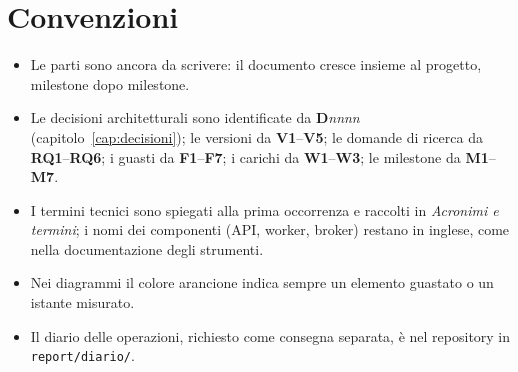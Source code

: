 \section*{Convenzioni}

\begin{itemize}
  \item Le parti  sono ancora da scrivere: il documento cresce insieme al progetto, milestone dopo milestone.
  \item Le decisioni architetturali sono identificate da \textbf{D}\textit{nnnn} (capitolo~\ref{cap:decisioni}); le versioni da \textbf{V1}--\textbf{V5}; le domande di ricerca da \textbf{RQ1}--\textbf{RQ6}; i guasti da \textbf{F1}--\textbf{F7}; i carichi da \textbf{W1}--\textbf{W3}; le milestone da \textbf{M1}--\textbf{M7}.
  \item I termini tecnici sono spiegati alla prima occorrenza e raccolti in \emph{Acronimi e termini}; i nomi dei componenti (API, worker, broker) restano in inglese, come nella documentazione degli strumenti.
  \item Nei diagrammi il colore arancione indica sempre un elemento guastato o un istante misurato.
  \item Il diario delle operazioni, richiesto come consegna separata, è nel repository in \texttt{report/diario/}.
\end{itemize}
